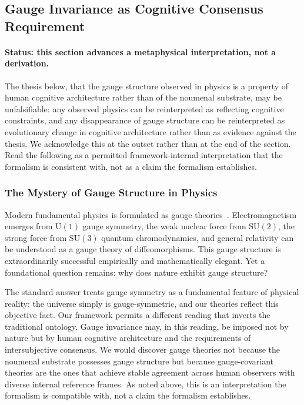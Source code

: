 \documentclass[11pt]{article}
\begin{document}
\subsection{Gauge Invariance as Cognitive Consensus Requirement}
\label{sec:gauge_invariance_consensus}

\paragraph{Status: this section advances a metaphysical interpretation, not a derivation.} The thesis below, that the gauge structure observed in physics is a property of human cognitive architecture rather than of the noumenal substrate, may be unfalsifiable: any observed physics can be reinterpreted as reflecting cognitive constraints, and any disappearance of gauge structure can be reinterpreted as evolutionary change in cognitive architecture rather than as evidence against the thesis. We acknowledge this at the outset rather than at the end of the section. Read the following as a permitted framework-internal interpretation that the formalism is consistent with, not as a claim the formalism establishes.

\subsubsection{The Mystery of Gauge Structure in Physics}

Modern fundamental physics is formulated as gauge theories~\cite{weinberg1995quantum}. Electromagnetism emerges from $\mathrm{U}(1)$ gauge symmetry, the weak nuclear force from $\mathrm{SU}(2)$, the strong force from $\mathrm{SU}(3)$ quantum chromodynamics, and general relativity can be understood as a gauge theory of diffeomorphisms. This gauge structure is extraordinarily successful empirically and mathematically elegant. Yet a foundational question remains: why does nature exhibit gauge structure?

The standard answer treats gauge symmetry as a fundamental feature of physical reality: the universe simply is gauge-symmetric, and our theories reflect this objective fact. Our framework permits a different reading that inverts the traditional ontology. Gauge invariance may, in this reading, be imposed not by nature but by human cognitive architecture and the requirements of intersubjective consensus. We would discover gauge theories not because the noumenal substrate possesses gauge structure but because gauge-covariant theories are the ones that achieve stable agreement across human observers with diverse internal reference frames. As noted above, this is an interpretation the formalism is compatible with, not a claim the formalism establishes.
\end{document}

